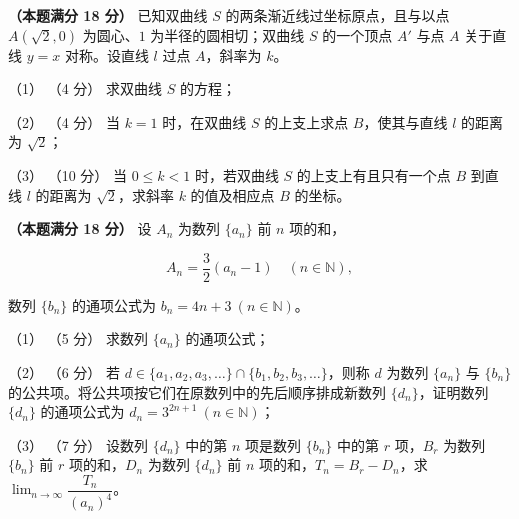 \begin{question}
\textbf{（本题满分 18 分）} 已知双曲线 $S$ 的两条渐近线过坐标原点，且与以点 $A(\sqrt2,0)$ 为圆心、$1$ 为半径的圆相切；双曲线 $S$ 的一个顶点 $A'$ 与点 $A$ 关于直线 $y=x$ 对称。设直线 $l$ 过点 $A$，斜率为 $k$。

（1） （4 分） 求双曲线 $S$ 的方程；

（2） （4 分） 当 $k=1$ 时，在双曲线 $S$ 的上支上求点 $B$，使其与直线 $l$ 的距离为 $\sqrt2$；

（3） （10 分） 当 $0\le k<1$ 时，若双曲线 $S$ 的上支上有且只有一个点 $B$ 到直线 $l$ 的距离为 $\sqrt2$，求斜率 $k$ 的值及相应点 $B$ 的坐标。
\nopagebreak[4]
\begin{center}\end{center}
\nopagebreak[4]
\end{question}
\begin{question}
\textbf{（本题满分 18 分）} 设 $A_n$ 为数列 $\{a_n\}$ 前 $n$ 项的和，

\nopagebreak[4]
\[
A_n=\dfrac32(a_n-1)\quad(n\in\mathbb N),
\]

数列 $\{b_n\}$ 的通项公式为 $b_n=4n+3\ (n\in\mathbb N)$。

（1） （5 分） 求数列 $\{a_n\}$ 的通项公式；

（2） （6 分） 若 $d\in\{a_1,a_2,a_3,\ldots\}\cap\{b_1,b_2,b_3,\ldots\}$，则称 $d$ 为数列 $\{a_n\}$ 与 $\{b_n\}$ 的公共项。将公共项按它们在原数列中的先后顺序排成新数列 $\{d_n\}$，证明数列 $\{d_n\}$ 的通项公式为 $d_n=3^{2n+1}\ (n\in\mathbb N)$；

（3） （7 分） 设数列 $\{d_n\}$ 中的第 $n$ 项是数列 $\{b_n\}$ 中的第 $r$ 项，$B_r$ 为数列 $\{b_n\}$ 前 $r$ 项的和，$D_n$ 为数列 $\{d_n\}$ 前 $n$ 项的和，$T_n=B_r-D_n$，求 $\displaystyle\lim_{n\to\infty}\dfrac{T_n}{(a_n)^4}$。

\end{question}